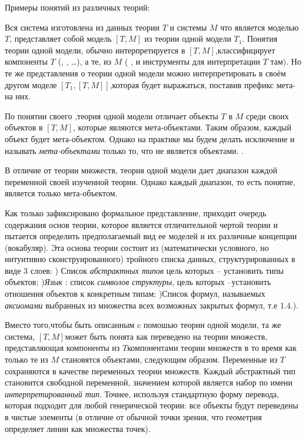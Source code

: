 Примеры понятий из различных теорий:
\sk
{}\sk


Вся система изготовлена ​​из данных теории  $T$ и системы $M$ что является моделью $T$, представляет собой модель $[T,M]$ из теории одной модели $T_1$. Понятия теории одной модели, обычно интерпретируется в $[T,M]$,классифицирует компоненты $T$ (, , \dots), а те, из $M$ ( , и инструменты для интерпретации $T$ там). Но те же представления о теории одной модели можно интерпретировать в своём другом моделе $[T_1,[T,M]]$,которая будет выражаться, поставив префикс мета-на них. 

По понятии своего ,теория одной модели отличает объекты $T$ в $M$ среди своих объектов в $[T,M]$, которые являются мета-объектами. Таким образом, каждый объект будет мета-объектом. Однако на практике мы будем делать исключение и называть {\it мета-объектами} только то, что не является объектами. . 

В отличие от теории множеств, теория одной модели дает диапазон каждой переменной своей изученной теории. Однако каждый диапазон, то есть понятие, является только мета-объектом.

Как только зафиксировано формальное представление, приходит очередь содержания основ теории, которое является отличительной чертой теории и пытается определить предполагаемый вид ее моделей и их различные концепции (вокабуляр). Эта основа теории состоит из (математически условного, но интуитивно сконструированного) тройного списка данных, структурированных в виде 3 слоев:
) Список {\it абстрактных типов} цель которых – установить типы объектов;
){\it Язык } : список {\it символов структуры}, цель которых –установить отношения объектов к конкретным типам;
)Список формул, называемых  {\it  аксиомами}  выбранных из множества всех возможных закрытых формул, т.е 1.4.).


Вместо того,чтобы быть описанным c помошью теории одной модели, та же система, $[T,M]$может быть понята как переведено на теории множеств, представляющая компоненты из $T$компонентами теории множеств в то время как только те из $M$ становятся объектами, следующим образом.
Переменные из $T$сохраняются в качестве переменных теории множеств. Каждый абстрактный тип становится свободной переменной, значением которой является набор по имени {\it интерпретированный тип}. 
Точнее, используя стандартную форму перевода, которая подходит для любой генерической теории: все объекты будут переведены в чистые элементы (в отличие от обычной точки зрения, что геометрия определяет линии как множества точек). 

